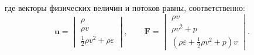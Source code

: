 \documentclass[a4paper]{article}
\begin{document}
	где векторы физических величин и потоков равны, соответственно:
	\begin{equation}
	\mathbf{u}	=	\begin{vmatrix}
						\rho								\\
						\rho v								\\
						\frac{1}{2}\rho v^2 + \rho \varepsilon		
					\end{vmatrix} , \qquad	
	\mathbf{F}	=	\begin{vmatrix}
						\rho v								\\
						\rho v^2 + p								\\
						\left(\rho \varepsilon + \frac{1}{2}\rho v^2 + p\right)v	
	\end{vmatrix}	.		
	\end{equation}
	
	
\end{document}
